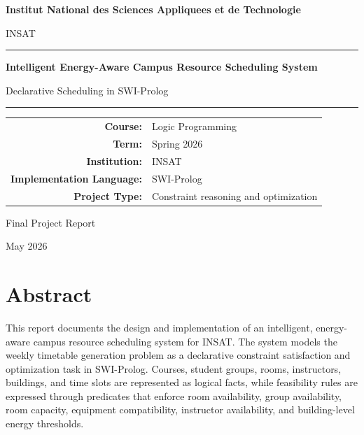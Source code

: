 \documentclass[12pt,a4paper]{article}
\begin{document}
\begin{titlepage}
    \centering
    \vspace*{1.2cm}
    {\Large\bfseries Institut National des Sciences Appliquees et de Technologie\par}
    \vspace{0.35cm}
    {\large INSAT\par}
    \vspace{1.8cm}
    {\color{insatblue}\rule{0.86\textwidth}{1.2pt}\par}
    \vspace{0.8cm}
    {\Huge\bfseries\color{insatblue} Intelligent Energy-Aware Campus Resource Scheduling System\par}
    \vspace{0.35cm}
    {\Large Declarative Scheduling in SWI-Prolog\par}
    \vspace{0.8cm}
    {\color{insatblue}\rule{0.86\textwidth}{1.2pt}\par}
    \vspace{1.5cm}
    \begin{tabular}{>{\bfseries}rl}
        Course: & Logic Programming \\
        Term: & Spring 2026 \\
        Institution: & INSAT \\
        Implementation Language: & SWI-Prolog \\
        Project Type: & Constraint reasoning and optimization \\
    \end{tabular}
    \vfill
    {\large Final Project Report\par}
    \vspace{0.35cm}
    {\large May 2026\par}
\end{titlepage}

\tableofcontents
\newpage

\section{Abstract}

This report documents the design and implementation of an intelligent, energy-aware campus resource scheduling system for INSAT. The system models the weekly timetable generation problem as a declarative constraint satisfaction and optimization task in SWI-Prolog. Courses, student groups, rooms, instructors, buildings, and time slots are represented as logical facts, while feasibility rules are expressed through predicates that enforce room availability, group availability, room capacity, equipment compatibility, instructor availability, and building-level energy thresholds.
\end{document}
